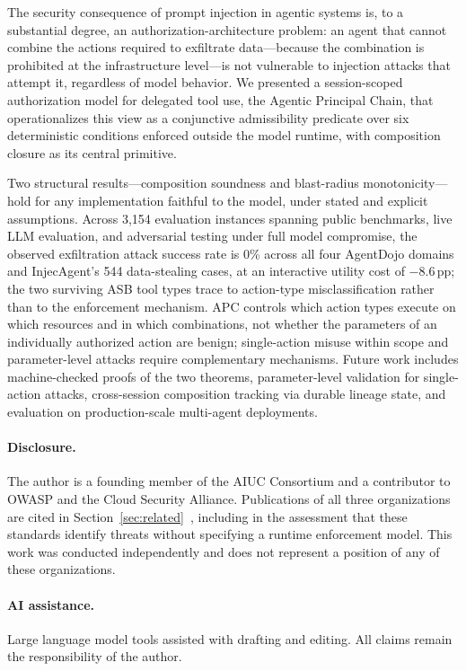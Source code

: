 \documentclass[sigconf,nonacm]{acmart}
\begin{document}
The security consequence of prompt injection in agentic systems is, to a substantial degree, an authorization-architecture problem: an agent that cannot combine the actions required to exfiltrate data---because the combination is prohibited at the infrastructure level---is not vulnerable to injection attacks that attempt it, regardless of model behavior. We presented a session-scoped authorization model for delegated tool use, the Agentic Principal Chain, that operationalizes this view as a conjunctive admissibility predicate over six deterministic conditions enforced outside the model runtime, with composition closure as its central primitive.

Two structural results---composition soundness and blast-radius monotonicity---hold for any implementation faithful to the model, under stated and explicit assumptions. Across 3,154 evaluation instances spanning public benchmarks, live LLM evaluation, and adversarial testing under full model compromise, the observed exfiltration attack success rate is 0\% across all four AgentDojo domains and InjecAgent's 544 data-stealing cases, at an interactive utility cost of $-$8.6\,pp; the two surviving ASB tool types trace to action-type misclassification rather than to the enforcement mechanism. APC controls which action types execute on which resources and in which combinations, not whether the parameters of an individually authorized action are benign; single-action misuse within scope and parameter-level attacks require complementary mechanisms. Future work includes machine-checked proofs of the two theorems, parameter-level validation for single-action attacks, cross-session composition tracking via durable lineage state, and evaluation on production-scale multi-agent deployments.

\paragraph{Disclosure.} The author is a founding member of the AIUC Consortium and a contributor to OWASP and the Cloud Security Alliance. Publications of all three organizations are cited in Section~\ref{sec:related}~\cite{aiuc2025, owaspllm2025, owaspagentic2025, owaspmaestro2025, csamaestro2025}, including in the assessment that these standards identify threats without specifying a runtime enforcement model. This work was conducted independently and does not represent a position of any of these organizations.

\paragraph{AI assistance.} Large language model tools assisted with drafting and editing. All claims remain the responsibility of the author.
\end{document}
